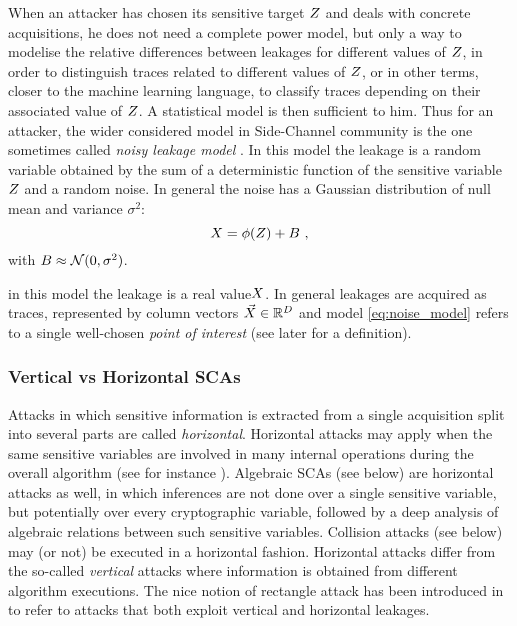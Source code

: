 When an attacker has chosen its sensitive target $Z$ and deals with concrete acquisitions, he does not need a complete power model, but only  a way to modelise the relative differences between leakages for different values of $Z$, in order to distinguish traces related to different values of $Z$, or in other terms, closer to the machine learning language, to classify traces depending on their associated value of $Z$. A statistical model is then sufficient to him. Thus for an attacker, the wider considered model in Side-Channel community is the one sometimes called \emph{noisy leakage model} \cite{chari1999towards}. In this model the leakage is a random variable obtained by the sum of a deterministic function of the sensitive variable $Z$ and a random noise. In general the noise has a Gaussian distribution of null mean and variance $\sigma^2$:
\begin{equation}\label{eq:noise_model}
X = \phi(Z) + B \mbox{ ,}
\end{equation}
with $B \approx \mathcal{N}(0,\sigma^2)$.
\begin{remark}
in this model the leakage is a real value$ X$. In general leakages are acquired as traces, 
represented by column vectors $\vec{X}\in\mathbb{R}^D$ and model \ref{eq:noise_model} refers to a single well-chosen \emph{point of interest} (see later for a definition).
\end{remark}

\subsubsection{Vertical vs Horizontal SCAs}
Attacks in which sensitive information
is extracted from a single acquisition split into several parts are called \emph{horizontal}. Horizontal attacks may apply when the same sensitive variables are involved in many internal operations during the overall algorithm (see for instance \cite{battistello2016horizontal}). Algebraic SCAs (see below) are horizontal attacks as well, in which inferences are not done over a single sensitive variable, but potentially over every cryptographic variable, followed by a deep analysis of algebraic relations between such sensitive variables. Collision attacks (see below) may (or not) be executed in a horizontal fashion. Horizontal attacks differ from the so-called \emph{vertical} attacks where information is obtained from different algorithm executions. The nice notion of rectangle attack has been introduced in \cite{bauer2013horizontal} to refer to attacks that both exploit vertical and horizontal leakages.

